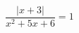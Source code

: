 \begin{ex}[type=equation]
	\begin{condition}
		$\dfrac{\big |x +3\big|}{x^2 + 5x + 6} = 1$
	\end{condition}
\end{ex}